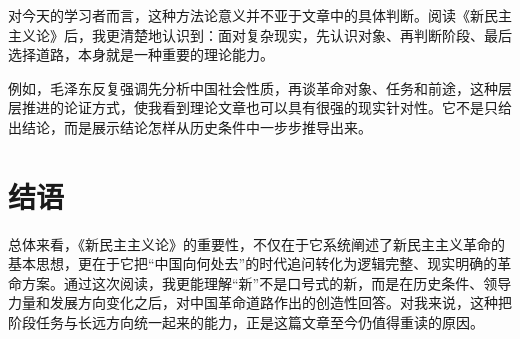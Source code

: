 \documentclass[12pt,a4paper]{ctexart}
\begin{document}
对今天的学习者而言，这种方法论意义并不亚于文章中的具体判断。阅读《新民主主义论》后，我更清楚地认识到：面对复杂现实，先认识对象、再判断阶段、最后选择道路，本身就是一种重要的理论能力。

例如，毛泽东反复强调先分析中国社会性质，再谈革命对象、任务和前途，这种层层推进的论证方式，使我看到理论文章也可以具有很强的现实针对性。它不是只给出结论，而是展示结论怎样从历史条件中一步步推导出来。

\section*{结语}

总体来看，《新民主主义论》的重要性，不仅在于它系统阐述了新民主主义革命的基本思想，更在于它把“中国向何处去”的时代追问转化为逻辑完整、现实明确的革命方案。通过这次阅读，我更能理解“新”不是口号式的新，而是在历史条件、领导力量和发展方向变化之后，对中国革命道路作出的创造性回答。对我来说，这种把阶段任务与长远方向统一起来的能力，正是这篇文章至今仍值得重读的原因。
\end{document}
